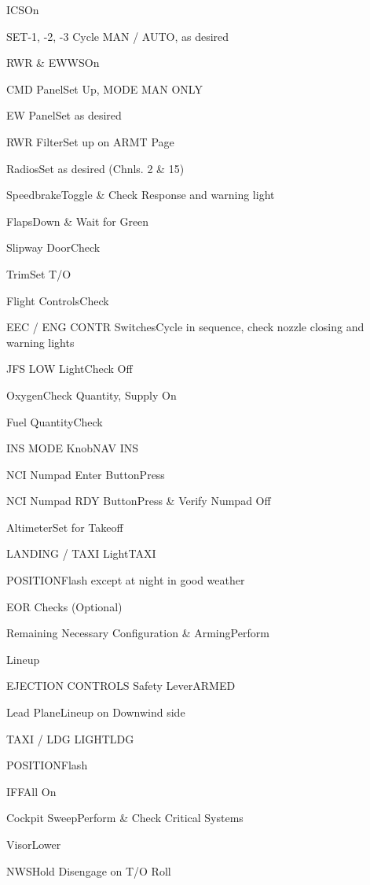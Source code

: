\documentclass[sim-use]{checklist}
\begin{document}
\begin{continuedchecklist}
	 {
		\item{ICS}{On}
		\item{SET-1, -2, -3} {Cycle MAN / AUTO, as desired}
		\item{RWR \& EWWS}{On}
		\item{CMD Panel}{Set Up, MODE MAN ONLY}
		\item{EW Panel}{Set as desired}
		\item{RWR Filter}{Set up on ARMT Page}
	}
	\item{Radios}{Set as desired (Chnls. 2 \& 15)}
	\item{Speedbrake}{Toggle \& Check Response and warning light}
	\item{Flaps}{Down \& Wait for Green}
	\item{Slipway Door}{Check}
	\item{Trim}{Set T/O}
	\item{Flight Controls}{Check}
	\item{EEC / ENG CONTR Switches}{Cycle in sequence, check nozzle closing and warning lights}
	\item{JFS LOW Light}{Check Off}
	\item{Oxygen}{Check Quantity, Supply On}
	\item{Fuel Quantity}{Check}
	 {
		\item{INS MODE Knob}{NAV INS}
		\item{NCI Numpad Enter Button}{Press}
		\item{NCI Numpad RDY Button}{Press \& Verify Numpad Off}
	}
	\item{Altimeter}{Set for Takeoff}
	\item{LANDING / TAXI Light}{TAXI}
	\item{POSITION}{Flash except at night in good weather}
\end{continuedchecklist}

\begin{checklist}{EOR Checks (Optional)}
	\item{Remaining Necessary Configuration \& Arming}{Perform}
\end{checklist}

\begin{checklist}{Lineup}
	\item{EJECTION CONTROLS Safety Lever}{ARMED}
	\item{Lead Plane}{Lineup on Downwind side}
	\item{TAXI / LDG LIGHT}{LDG}
\end{checklist}

\begin{continuedchecklist}
	\item{POSITION}{Flash}
	\item{IFF}{All On}
	\item{Cockpit Sweep}{Perform \& Check Critical Systems}
	\item{Visor}{Lower}
	\item{NWS}{Hold Disengage on T/O Roll}
\end{continuedchecklist}
\end{document}
